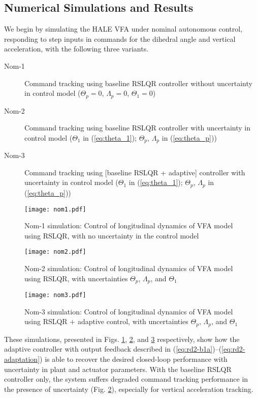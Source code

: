 \subsection{Numerical Simulations and Results} \label{subsec:sims}
We begin by simulating the HALE VFA under nominal autonomous control, responding to step inputs in commands for the dihedral angle and vertical acceleration, with the following three variants.
\begin{description}
	\item[Nom-1] Command tracking using baseline RSLQR controller without uncertainty in control model ($\Theta_p = 0$, $\Lambda_p = 0$, $\Theta_1 = 0$)
	\item[Nom-2] Command tracking using baseline RSLQR controller with uncertainty in control model ($\Theta_1$ in (\ref{eq:theta_1}); $\Theta_p$, $\Lambda_p$ in (\ref{eq:theta_p}))
	\item[Nom-3] Command tracking using [baseline RSLQR + adaptive] controller with uncertainty in control model ($\Theta_1$ in (\ref{eq:theta_1}); $\Theta_p$, $\Lambda_p$ in (\ref{eq:theta_p}))
\end{description}

\begin{figure}[htbp]
	\centering
	\texttt{[image: nom1.pdf]}
	\caption{Nom-1 simulation: Control of longitudinal dynamics of VFA model using RSLQR, with no uncertainty in the control model}
	\label{fig:nom1}
\end{figure}

\begin{figure}[htbp]
	\centering
	\texttt{[image: nom2.pdf]}
	\caption{Nom-2 simulation: Control of longitudinal dynamics of VFA model using RSLQR, with uncertainties $\Theta_p$, $\Lambda_p$, and $\Theta_1$}
	\label{fig:nom2}
\end{figure}

\begin{figure}[htbp]
	\centering
	\texttt{[image: nom3.pdf]}
	\caption{Nom-3 simulation: Control of longitudinal dynamics of VFA model using RSLQR + adaptive control, with uncertainties $\Theta_p$, $\Lambda_p$, and $\Theta_1$}
	\label{fig:nom3}
\end{figure}

These simulations, presented in Figs. \ref{fig:nom1}, \ref{fig:nom2}, and \ref{fig:nom3} respectively, show how the adaptive controller with output feedback described in (\ref{eq:rd2-b1a})--(\ref{eq:rd2-adaptation}) is able to recover the desired closed-loop performance with uncertainty in plant and actuator parameters. With the baseline RSLQR controller only, the system suffers degraded command tracking performance in the presence of uncertainty (Fig. \ref{fig:nom2}), especially for vertical acceleration tracking.

